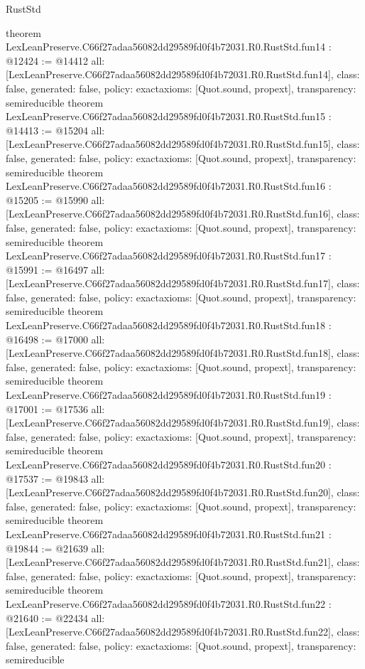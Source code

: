 \begin{lexlean}{RustStd}
\begin{coremodule}
{}
theorem LexLeanPreserve.C66f27adaa56082dd29589fd0f4b72031.R0.RustStd.fun14 : @12424 := @14412 {
  all: [LexLeanPreserve.C66f27adaa56082dd29589fd0f4b72031.R0.RustStd.fun14],
  class: false,
  generated: false,
  policy: exact{axioms: [Quot.sound, propext]},
  transparency: semireducible
}
theorem LexLeanPreserve.C66f27adaa56082dd29589fd0f4b72031.R0.RustStd.fun15 : @14413 := @15204 {
  all: [LexLeanPreserve.C66f27adaa56082dd29589fd0f4b72031.R0.RustStd.fun15],
  class: false,
  generated: false,
  policy: exact{axioms: [Quot.sound, propext]},
  transparency: semireducible
}
theorem LexLeanPreserve.C66f27adaa56082dd29589fd0f4b72031.R0.RustStd.fun16 : @15205 := @15990 {
  all: [LexLeanPreserve.C66f27adaa56082dd29589fd0f4b72031.R0.RustStd.fun16],
  class: false,
  generated: false,
  policy: exact{axioms: [Quot.sound, propext]},
  transparency: semireducible
}
theorem LexLeanPreserve.C66f27adaa56082dd29589fd0f4b72031.R0.RustStd.fun17 : @15991 := @16497 {
  all: [LexLeanPreserve.C66f27adaa56082dd29589fd0f4b72031.R0.RustStd.fun17],
  class: false,
  generated: false,
  policy: exact{axioms: [Quot.sound, propext]},
  transparency: semireducible
}
theorem LexLeanPreserve.C66f27adaa56082dd29589fd0f4b72031.R0.RustStd.fun18 : @16498 := @17000 {
  all: [LexLeanPreserve.C66f27adaa56082dd29589fd0f4b72031.R0.RustStd.fun18],
  class: false,
  generated: false,
  policy: exact{axioms: [Quot.sound, propext]},
  transparency: semireducible
}
theorem LexLeanPreserve.C66f27adaa56082dd29589fd0f4b72031.R0.RustStd.fun19 : @17001 := @17536 {
  all: [LexLeanPreserve.C66f27adaa56082dd29589fd0f4b72031.R0.RustStd.fun19],
  class: false,
  generated: false,
  policy: exact{axioms: [Quot.sound, propext]},
  transparency: semireducible
}
theorem LexLeanPreserve.C66f27adaa56082dd29589fd0f4b72031.R0.RustStd.fun20 : @17537 := @19843 {
  all: [LexLeanPreserve.C66f27adaa56082dd29589fd0f4b72031.R0.RustStd.fun20],
  class: false,
  generated: false,
  policy: exact{axioms: [Quot.sound, propext]},
  transparency: semireducible
}
theorem LexLeanPreserve.C66f27adaa56082dd29589fd0f4b72031.R0.RustStd.fun21 : @19844 := @21639 {
  all: [LexLeanPreserve.C66f27adaa56082dd29589fd0f4b72031.R0.RustStd.fun21],
  class: false,
  generated: false,
  policy: exact{axioms: [Quot.sound, propext]},
  transparency: semireducible
}
theorem LexLeanPreserve.C66f27adaa56082dd29589fd0f4b72031.R0.RustStd.fun22 : @21640 := @22434 {
  all: [LexLeanPreserve.C66f27adaa56082dd29589fd0f4b72031.R0.RustStd.fun22],
  class: false,
  generated: false,
  policy: exact{axioms: [Quot.sound, propext]},
  transparency: semireducible
}
\end{coremodule}
\end{lexlean}
